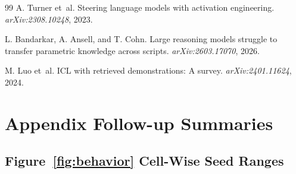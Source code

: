 \documentclass{article}
\begin{document}
\begin{thebibliography}{99}
A. Turner et~al. Steering language models with activation engineering. \emph{arXiv:2308.10248}, 2023.

L. Bandarkar, A. Ansell, and T. Cohn. Large reasoning models struggle to transfer parametric knowledge across scripts. \emph{arXiv:2603.17070}, 2026.

M. Luo et~al. ICL with retrieved demonstrations: A survey. \emph{arXiv:2401.11624}, 2024.

\end{thebibliography}

\clearpage
\appendix
\section{Appendix Follow-up Summaries}\label{app:followups}

\subsection{Figure~\ref{fig:behavior} Cell-Wise Seed Ranges}\label{app:behavior_seed_ranges}
\end{document}
